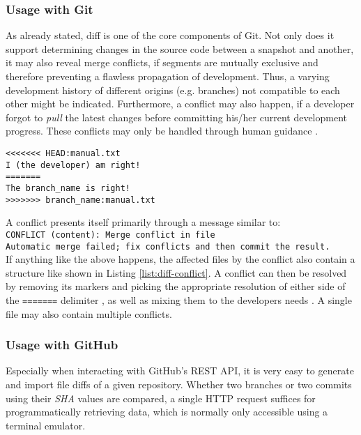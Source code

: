 \subsubsection{Usage with Git}
As already stated, diff is one of the core components of Git. Not only does it support determining changes in the source code between a snapshot and another, it may also reveal merge conflicts, if segments are mutually exclusive and therefore preventing a flawless propagation of development. Thus, a varying development history of different origins (e.g. branches) not compatible to each other might be indicated. Furthermore, a conflict may also happen, if a developer forgot to \emph{pull} the latest changes before committing his/her current development progress. These conflicts may only be handled through human guidance \cite[124]{loeliger2012version}.

\begin{lstlisting}[label={list:diff-conflict}, caption={A snippet of a file called ``manual.txt'', which is affected by a conflict. Content between \texttt{HEAD} and \texttt{=======} contains the local version, content below contains the foreign conflicting version.}]
<<<<<<< HEAD:manual.txt
I (the developer) am right!
=======
The branch_name is right!
>>>>>>> branch_name:manual.txt
\end{lstlisting}

A conflict presents itself primarily through a message similar to:\\
\texttt{CONFLICT (content): Merge conflict in file\\
Automatic merge failed; fix conflicts and then commit the result.}\\
If anything like the above happens, the affected files by the conflict also contain a structure like shown in Listing \ref{list:diff-conflict}. A conflict can then be resolved by removing its markers and picking the appropriate resolution of either side of the \texttt{=======} delimiter \cite{GitConflicts}, as well as mixing them to the developers needs \cite[126]{loeliger2012version}. A single file may also contain multiple conflicts.

\subsubsection{Usage with GitHub}
Especially when interacting with GitHub's REST API, it is very easy to generate and import file diffs of a given repository. Whether two branches or two commits using their \emph{SHA} values are compared, a single HTTP request suffices for programmatically retrieving data, which is normally only accessible using a terminal emulator.

